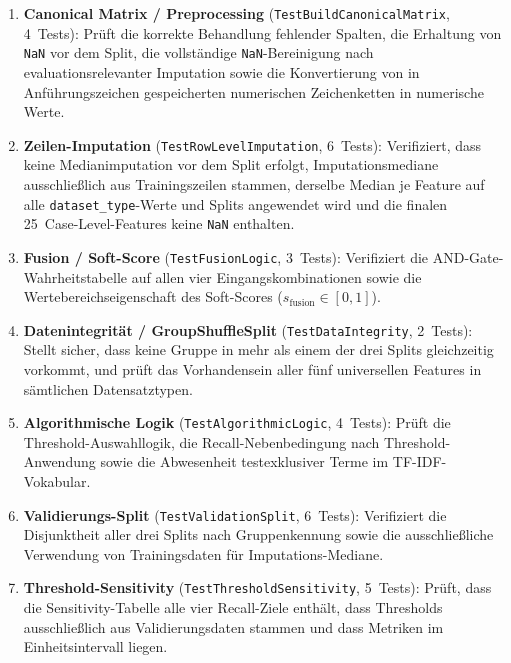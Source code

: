 \begin{enumerate}
  \item \textbf{Canonical Matrix / Preprocessing} (\texttt{TestBuildCanonicalMatrix}, 4~Tests): Prüft die korrekte Behandlung fehlender Spalten, die Erhaltung von \texttt{NaN} vor dem Split, die vollständige \texttt{NaN}-Bereinigung nach evaluationsrelevanter Imputation sowie die Konvertierung von in Anführungszeichen gespeicherten numerischen Zeichenketten in numerische Werte.

  \item \textbf{Zeilen-Imputation} (\texttt{TestRowLevelImputation}, 6~Tests): Verifiziert, dass keine Medianimputation vor dem Split erfolgt, Imputationsmediane ausschließlich aus Trainingszeilen stammen, derselbe Median je Feature auf alle \texttt{dataset\_type}-Werte und Splits angewendet wird und die finalen 25~Case-Level-Features keine \texttt{NaN} enthalten.

  \item \textbf{Fusion / Soft-Score} (\texttt{TestFusionLogic}, 3~Tests): Verifiziert die AND-Gate-Wahr\-heits\-tabelle auf allen vier Eingangskombinationen sowie die Wertebereichseigenschaft des Soft-Scores ($s_{\text{fusion}} \in [0,1]$).

  \item \textbf{Datenintegrität / GroupShuffleSplit} (\texttt{TestDataIntegrity}, 2~Tests): Stellt sicher, dass keine Gruppe in mehr als einem der drei Splits gleichzeitig vorkommt, und prüft das Vorhandensein aller fünf universellen Features in sämtlichen Datensatztypen.

  \item \textbf{Algorithmische Logik} (\texttt{TestAlgorithmicLogic}, 4~Tests): Prüft die Threshold-Auswahllogik, die Recall-Nebenbedingung nach Threshold-Anwendung sowie die Abwesenheit testexklusiver Terme im TF-IDF-Vokabular.

  \item \textbf{Validierungs-Split} (\texttt{TestValidationSplit}, 6~Tests): Verifiziert die Disjunktheit aller drei Splits nach Gruppenkennung sowie die ausschließliche Verwendung von Trainingsdaten für Imputations-Mediane.

  \item \textbf{Threshold-Sensitivity} (\texttt{TestThresholdSensitivity}, 5~Tests): Prüft, dass die Sensitivity-Tabelle alle vier Recall-Ziele enthält, dass Thresholds ausschließlich aus Validierungsdaten stammen und dass Metriken im Einheitsintervall liegen.


\end{enumerate}
